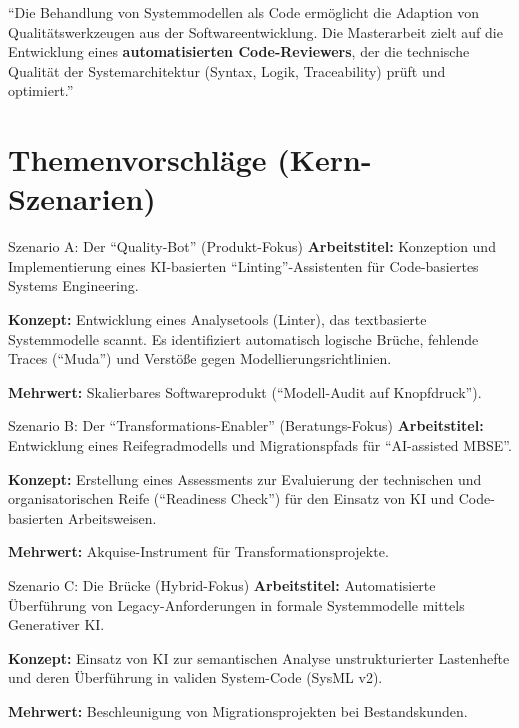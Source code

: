 \documentclass[a4paper,11pt]{article}
\begin{document}
\begin{tcolorbox}[colback=white, colframe=accentColor, title=Das zentrale Wertversprechen]
\enquote{Die Behandlung von Systemmodellen als Code ermöglicht die Adaption von Qualitätswerkzeugen aus der Softwareentwicklung. Die Masterarbeit zielt auf die Entwicklung eines \textbf{automatisierten Code-Reviewers}, der die technische Qualität der Systemarchitektur (Syntax, Logik, Traceability) prüft und optimiert.}
\end{tcolorbox}

\section{Themenvorschläge (Kern-Szenarien)}

\begin{scenariobox}{Szenario A: Der \enquote{Quality-Bot} (Produkt-Fokus)}
    \textbf{Arbeitstitel:} Konzeption und Implementierung eines KI-basierten \enquote{Linting}-Assistenten für Code-basiertes Systems Engineering.
    
    \textbf{Konzept:} Entwicklung eines Analysetools (Linter), das textbasierte Systemmodelle scannt. Es identifiziert automatisch logische Brüche, fehlende Traces (\enquote{Muda}) und Verstöße gegen Modellierungsrichtlinien.
    
    \textbf{Mehrwert:} Skalierbares Softwareprodukt (\enquote{Modell-Audit auf Knopfdruck}).
\end{scenariobox}

\vspace{0.3cm}

\begin{scenariobox}{Szenario B: Der \enquote{Transformations-Enabler} (Beratungs-Fokus)}
    \textbf{Arbeitstitel:} Entwicklung eines Reifegradmodells und Migrationspfads für \enquote{AI-assisted MBSE}.
    
    \textbf{Konzept:} Erstellung eines Assessments zur Evaluierung der technischen und organisatorischen Reife (\enquote{Readiness Check}) für den Einsatz von KI und Code-basierten Arbeitsweisen.
    
    \textbf{Mehrwert:} Akquise-Instrument für Transformationsprojekte.
\end{scenariobox}

\vspace{0.3cm}

\begin{scenariobox}{Szenario C: Die Brücke (Hybrid-Fokus)}
    \textbf{Arbeitstitel:} Automatisierte Überführung von Legacy-Anforderungen in formale Systemmodelle mittels Generativer KI.
    
    \textbf{Konzept:} Einsatz von KI zur semantischen Analyse unstrukturierter Lastenhefte und deren Überführung in validen System-Code (SysML v2).
    
    \textbf{Mehrwert:} Beschleunigung von Migrationsprojekten bei Bestandskunden.
\end{scenariobox}
\end{document}
